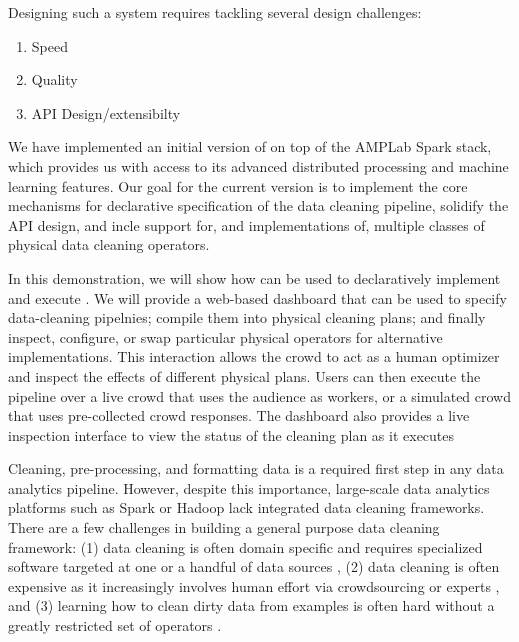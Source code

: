 Designing such a system requires tackling several design challenges:

\begin{enumerate}
\item Speed
\item Quality
\item API Design/extensibilty
\end{enumerate}



We have implemented an initial version of \sys on top of the AMPLab Spark stack, which provides us 
with access to its advanced distributed processing and machine learning features.  Our goal for the current
version is to implement the core mechanisms for declarative specification of the
data cleaning pipeline, solidify the API design, and incle support for, and implementations of,
multiple classes of physical data cleaning operators.

In this demonstration, we will show how \sys can be used to declaratively implement and execute
.   We will provide a web-based dashboard that
can be used to specify data-cleaning pipelnies; compile them into physical cleaning plans; and finally inspect, configure, or swap 
particular physical operators for alternative implementations.  This interaction allows the crowd to 
act as a human optimizer and inspect the effects of different physical plans.  Users can then
execute the pipeline over a live crowd that uses the audience as workers, or a simulated crowd
that uses pre-collected crowd responses.    The dashboard also provides a live inspection
interface to view the status of the cleaning plan as it executes 





Cleaning, pre-processing, and formatting data is a required first step in any data analytics pipeline.
However, despite this importance, large-scale data analytics platforms such as Spark or Hadoop lack integrated data cleaning frameworks.
There are a few challenges in building a general purpose data cleaning framework: (1) data cleaning is often
domain specific and requires specialized software targeted at one or a handful of data sources \cite{wang1999sample}, (2) data cleaning is often 
expensive as it increasingly involves human effort via crowdsourcing or experts \cite{DBLP:conf/sigmod/GokhaleDDNRSZ14}, and (3) learning how to clean dirty data from examples
is often hard without a greatly restricted set of operators \cite{DBLP:conf/uist/GuoKHH11}.

